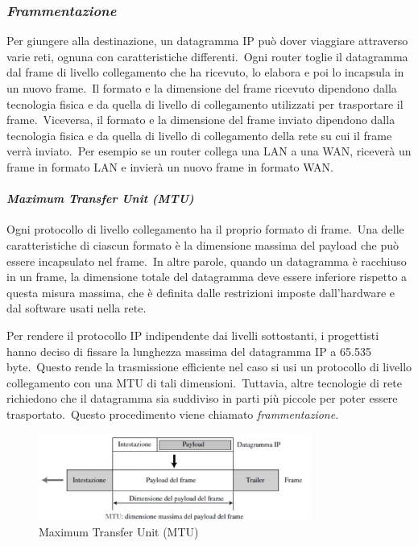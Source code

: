 \subsubsection{\emph{Frammentazione}}

Per giungere alla destinazione, un datagramma IP può dover viaggiare attraverso varie reti, ognuna con caratteristiche differenti.\
Ogni router toglie il datagramma dal frame di livello collegamento che ha ricevuto, lo elabora e poi lo incapsula in un nuovo frame.\
Il formato e la dimensione del frame ricevuto dipendono dalla tecnologia fisica e da quella di livello di collegamento utilizzati per trasportare il frame.\
Viceversa, il formato e la dimensione del frame inviato dipendono dalla tecnologia fisica e da quella di livello di collegamento della rete su cui il frame verrà inviato.\
Per esempio se un router collega una LAN a una WAN, riceverà un frame in formato LAN e invierà un nuovo frame in formato WAN.

\paragraph{\emph{Maximum Transfer Unit (MTU)}} Ogni protocollo di livello collegamento ha il proprio formato di frame.\
Una delle caratteristiche di ciascun formato è la dimensione massima del payload che può essere incapsulato nel frame.\
In altre parole, quando un datagramma è racchiuso in un frame, la dimensione totale del datagramma deve essere inferiore rispetto a questa misura massima, che è definita dalle restrizioni imposte dall'hardware e dal software usati nella rete.

Per rendere il protocollo IP indipendente dai livelli sottostanti, i progettisti hanno deciso di fissare la lunghezza massima del datagramma IP a 65.535 byte.\
Questo rende la trasmissione efficiente nel caso si usi un protocollo di livello collegamento con una MTU di tali dimensioni.\
Tuttavia, altre tecnologie di rete richiedono che il datagramma sia suddiviso in parti più piccole per poter essere trasportato.\
Questo procedimento viene chiamato \emph{frammentazione}.

\begin{figure}[H]
    \centering
    \includegraphics[width = 0.8\textwidth]{immagini/Frammentazione.jpg}
    \caption*{Maximum Transfer Unit (MTU)}
\end{figure}


